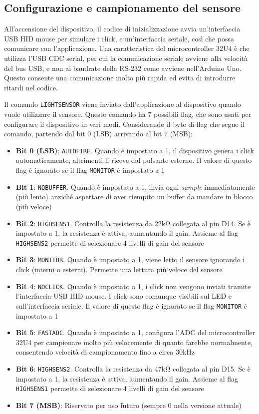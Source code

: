 \subsection{Configurazione e campionamento del sensore}
All'accensione del dispositivo, il codice di inizializzazione avvia un'interfaccia USB HID mouse per simulare i click, e un'interfaccia seriale, così che possa comunicare con l'applicazione. Una caratteristica del microcontroller 32U4 è che utilizza l'USB CDC serial, per cui la comunicazione seriale avviene alla velocità del bus USB, e non ai baudrate della RS-232 come avviene nell'Arduino Uno. Questo consente una comunicazione molto più rapida ed evita di introdurre ritardi nel codice.

Il comando \texttt{LIGHTSENSOR} viene inviato dall'applicazione al dispositivo quando vuole utilizzare il sensore. Questo comando ha 7 possibili flag, che sono usati per configurare il dispositivo in vari modi. Considerando il byte di flag che segue il comando, partendo dal bit 0 (LSB) arrivando al bit 7 (MSB):
\begin{itemize}
	\item \textbf{Bit 0 (LSB)}: \texttt{AUTOFIRE}. Quando è impostato a 1, il dispositivo genera i click automaticamente, altrimenti li riceve dal pulsante esterno. Il valore di questo flag è ignorato se il flag \texttt{MONITOR} è impostato a 1
	\item \textbf{Bit 1}: \texttt{NOBUFFER}. Quando è impostato a 1, invia ogni \textit{sample} immediatamente (più lento) anziché aspettare di aver riempito un buffer da mandare in blocco (più veloce)
	\item \textbf{Bit 2}: \texttt{HIGHSENS1}. Controlla la resistenza da 22k\si{\ohm} collegata al pin D14. Se è impostato a 1, la resistenza è attiva, aumentando il gain. Assieme al flag \texttt{HIGHSENS2} permette di selezionare 4 livelli di gain del sensore
	\item \textbf{Bit 3}: \texttt{MONITOR}. Quando è impostato a 1, viene letto il sensore ignorando i click (interni o esterni). Permette una lettura più veloce del sensore
	\item \textbf{Bit 4}: \texttt{NOCLICK}. Quando è impostato a 1, i click non vengono inviati tramite l'interfaccia USB HID mouse. I click sono comunque visibili sul LED e sull'interfaccia seriale. Il valore di questo flag è ignorato se il flag \texttt{MONITOR} è impostato a 1
	\item \textbf{Bit 5}: \texttt{FASTADC}. Quando è impostato a 1, configura l'ADC del microcontroller 32U4 per campionare molto più velocemente di quanto farebbe normalmente, consentendo velocità di campionamento fino a circa 30kHz
	\item \textbf{Bit 6}: \texttt{HIGHSENS2}. Controlla la resistenza da 47k\si{\ohm} collegata al pin D15. Se è impostato a 1, la resistenza è attiva, aumentando il gain. Assieme al flag \texttt{HIGHSENS1} permette di selezionare 4 livelli di gain del sensore
	\item \textbf{Bit 7 (MSB)}: Riservato per uso futuro (sempre 0 nella versione attuale)
\end{itemize}

